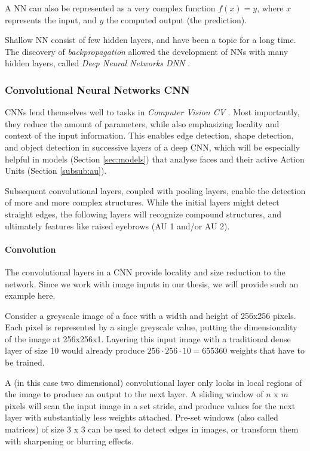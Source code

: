 A NN can also be represented as a very complex function $f(x) = y$, where $x$ represents the input, and $y$ the computed output (the prediction).

Shallow NN consist of few hidden layers, and have been a topic for a long time. The discovery of \emph{backpropagation} allowed the development of NNs with many hidden layers, called \emph{Deep Neural Networks DNN} \cite{schmidhuber2015deep}.

\subsubsection{Convolutional Neural Networks CNN}
CNNs lend themselves well to tasks in \emph{Computer Vision CV} \cite{albawi2017understanding}. Most importantly, they reduce the amount of parameters, while also emphasizing locality and context of the input information. This enables edge detection, shape detection, and object detection in successive layers of a deep CNN, which will be especially helpful in models (Section \ref{sec:models}) that analyse faces and their active Action Units (Section \ref{subsub:au}).

Subsequent convolutional layers, coupled with pooling layers, enable the detection of more and more complex structures. While the initial layers might detect straight edges, the following layers will recognize compound structures, and ultimately features like raised eyebrows (AU 1 and/or AU 2).

\paragraph{Convolution}
The convolutional layers in a CNN provide locality and size reduction to the network. Since we work with image inputs in our thesis, we will provide such an example here.

Consider a greyscale image of a face with a width and height of 256x256 pixels. Each pixel is represented by a single greyscale value, putting the dimensionality of the image at 256x256x1. Layering this input image with a traditional dense layer of size 10 would already produce $256 \cdot 256 \cdot 10 = 655360$ weights that have to be trained. 

A (in this case two dimensional) convolutional layer only looks in local regions of the image to produce an output to the next layer. A sliding window of $n$ x $m$ pixels will scan the input image in a set stride, and produce values for the next layer with substantially less weights attached. Pre-set windows (also called matrices) of size 3 x 3 can be used to detect edges in images, or transform them with sharpening or blurring effects.

